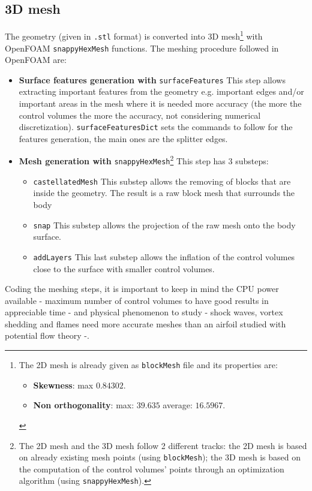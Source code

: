 \subsection{3D mesh} \label{sec:3Dmesh}
The geometry (given in \verb|.stl| format) is converted into 3D mesh\cprotect\footnote{The 2D mesh is already given as \verb|blockMesh| file and its properties are:
\begin{itemize}
    \item \textbf{Skewness}: max $0.84302$. 
    \item \textbf{Non orthogonality}: max: $39.635$ average: $16.5967$. 
\end{itemize}} with OpenFOAM \verb|snappyHexMesh| functions. The meshing procedure followed in OpenFOAM are:
\begin{itemize}
    \item \textbf{Surface features generation with} \verb|surfaceFeatures| This step allows extracting important features from the geometry e.g. important edges and/or important areas in the mesh where it is needed more accuracy (the more the control volumes the more the accuracy, not considering numerical discretization). \verb|surfaceFeaturesDict| sets the commands to follow for the features generation, the main ones are the splitter edges.
    \item \textbf{Mesh generation with} \verb|snappyHexMesh|\cprotect\footnote{The 2D mesh and the 3D mesh follow 2 different tracks: the 2D mesh is based on already existing mesh points (using \verb|blockMesh|); the 3D mesh is based on the computation of the control volumes' points through an optimization algorithm (using \verb|snappyHexMesh|).} This step has 3 substeps:
        \begin{itemize}
            \item \verb|castellatedMesh| This substep allows the removing of blocks that are inside the geometry. The result is a raw block mesh that surrounds the body 
            \item \verb|snap| This substep allows the projection of the raw mesh onto the body surface. 
            \item \verb|addLayers| This last substep allows the inflation of the control volumes close to the surface with smaller control volumes.
        \end{itemize}
\end{itemize}

Coding the meshing steps, it is important to keep in mind the CPU power available - maximum number of control volumes to have good results in appreciable time - and  physical phenomenon to study - shock waves, vortex shedding and flames need more accurate meshes than an airfoil studied with potential flow theory -.   

